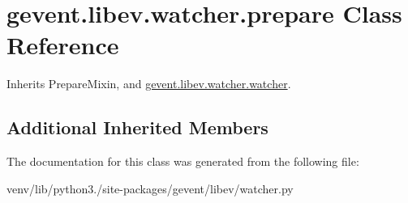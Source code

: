 \hypertarget{classgevent_1_1libev_1_1watcher_1_1prepare}{}\section{gevent.\+libev.\+watcher.\+prepare Class Reference}
\label{classgevent_1_1libev_1_1watcher_1_1prepare}


Inherits Prepare\+Mixin, and \hyperlink{classgevent_1_1libev_1_1watcher_1_1watcher}{gevent.\+libev.\+watcher.\+watcher}.

\subsection*{Additional Inherited Members}


The documentation for this class was generated from the following file\+:\begin{DoxyCompactItemize}
\item 
venv/lib/python3./site-\/packages/gevent/libev/watcher.\+py\end{DoxyCompactItemize}

